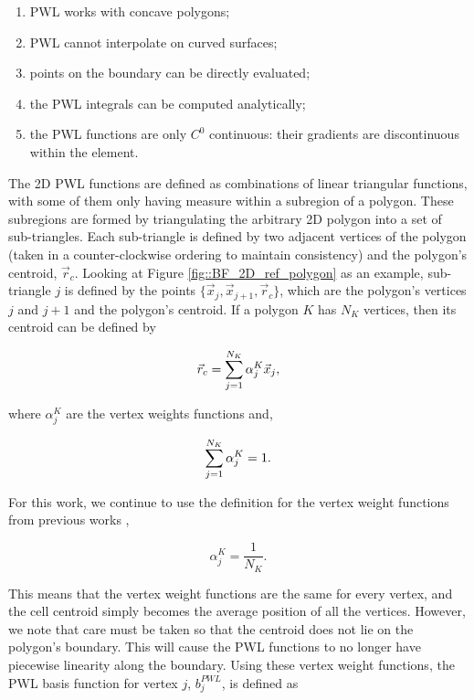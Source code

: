 \begin{enumerate}
\item PWL works with concave polygons;
\item PWL cannot interpolate on curved surfaces;
\item points on the boundary can be directly evaluated;
\item the PWL integrals can be computed analytically;
\item the PWL functions are only $C^0$ continuous: their gradients are discontinuous within the element.
\end{enumerate}

The 2D PWL functions are defined as combinations of linear triangular functions, with some of them only having measure within a subregion of a polygon. These subregions are formed by triangulating the arbitrary 2D polygon into a set of sub-triangles. Each sub-triangle is defined by two adjacent vertices of the polygon (taken in a counter-clockwise ordering to maintain consistency) and the polygon's centroid, $\vec{r}_{c}$. Looking at Figure \ref{fig::BF_2D_ref_polygon} as an example, sub-triangle $j$ is defined by the points $\{ \vec{x}_j , \vec{x}_{j+1}, \vec{r}_c \}$, which are the polygon's vertices $j$ and $j+1$ and the polygon's centroid. If a polygon $K$ has $N_K$ vertices, then its centroid can be defined by

\begin{equation}
\label{eq::PWL_2D_centroid}
	\vec{r}_{c} =  \sum\displaylimits_{j=1}^{N_K} \alpha_{j}^{K}  \vec{x}_j ,
\end{equation}

\noindent where $\alpha_{j}^{K}$ are the vertex weights functions and, 

\begin{equation}
\label{eq::PWL_2D_vertex_weight_sum}
 \sum\displaylimits_{j=1}^{N_K} \alpha_{j}^{K} = 1.
\end{equation}

\noindent For this work, we continue to use the definition for the vertex weight functions from previous works \cite{ref::PWLD_stone_adams,ref::PWLD_stone_adams_unstructured,bailey2008phd},

\begin{equation}
\label{eq::PWL_2D_vertex_weight_val}
\alpha_{j}^{K} = \frac{1}{N_K} .
\end{equation}

\noindent This means that the vertex weight functions are the same for every vertex, and the cell centroid simply becomes the average position of all the vertices. However, we note that care must be taken so that the centroid does not lie on the polygon's boundary. This will cause the PWL functions to no longer have piecewise linearity along the boundary. Using these vertex weight functions, the PWL basis function for vertex $j$, $b_j^{PWL}$, is defined as

